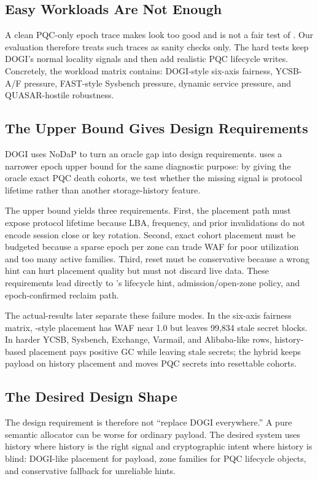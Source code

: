 \subsection{Easy Workloads Are Not Enough}

A clean PQC-only epoch trace makes \system look too good and is not a fair test of \dogi.  Our evaluation therefore treats such traces as sanity checks only.  The hard tests keep DOGI's normal locality signals and then add realistic PQC lifecycle writes.  Concretely, the workload matrix contains: DOGI-style six-axis fairness, YCSB-A/F pressure, FAST-style Sysbench pressure, dynamic service pressure, and QUASAR-hostile robustness.

\subsection{The Upper Bound Gives Design Requirements}

DOGI uses NoDaP to turn an oracle gap into design requirements.  \system uses a narrower epoch upper bound for the same diagnostic purpose: by giving the oracle exact PQC death cohorts, we test whether the missing signal is protocol lifetime rather than another storage-history feature.

The upper bound yields three requirements.  First, the placement path must expose protocol lifetime because LBA, frequency, and prior invalidations do not encode session close or key rotation.  Second, exact cohort placement must be budgeted because a sparse epoch per zone can trade WAF for poor utilization and too many active families.  Third, reset must be conservative because a wrong hint can hurt placement quality but must not discard live data.  These requirements lead directly to \system's lifecycle hint, admission/open-zone policy, and epoch-confirmed reclaim path.

The actual-\zns results later separate these failure modes.  In the six-axis fairness matrix, \dogi-style placement has WAF near 1.0 but leaves 99,834 stale secret blocks.  In harder YCSB, Sysbench, Exchange, Varmail, and Alibaba-like rows, history-based placement pays positive GC while leaving stale secrets; the hybrid keeps payload on history placement and moves PQC secrets into resettable cohorts.

\subsection{The Desired Design Shape}

The design requirement is therefore not ``replace DOGI everywhere.''  A pure semantic allocator can be worse for ordinary payload.  The desired system uses history where history is the right signal and cryptographic intent where history is blind: DOGI-like placement for payload, \system zone families for PQC lifecycle objects, and conservative fallback for unreliable hints.
